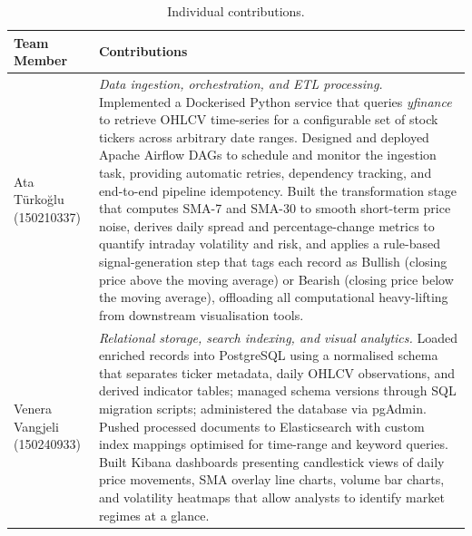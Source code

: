 \documentclass[conference]{IEEEtran}
\begin{document}
\begin{table}[ht]
  \centering
  \caption{Individual contributions.}
  \begin{tabular}{p{3cm}p{4.5cm}}
    \toprule
    \textbf{Team Member} & \textbf{Contributions} \\
    \midrule
    Ata Türkoğlu (150210337) &
      \textit{Data ingestion, orchestration, and ETL processing.}
      Implemented a Dockerised Python service that queries \textit{yfinance}
      to retrieve OHLCV time-series for a configurable set of stock tickers
      across arbitrary date ranges.
      Designed and deployed Apache Airflow DAGs to schedule and monitor the
      ingestion task, providing automatic retries, dependency tracking, and
      end-to-end pipeline idempotency.
      Built the transformation stage that computes SMA-7 and SMA-30 to smooth
      short-term price noise, derives daily spread and percentage-change metrics
      to quantify intraday volatility and risk, and applies a rule-based
      signal-generation step that tags each record as Bullish (closing price
      above the moving average) or Bearish (closing price below the moving
      average), offloading all computational heavy-lifting from downstream
      visualisation tools. \\
    \midrule
    Venera Vangjeli (150240933) &
      \textit{Relational storage, search indexing, and visual analytics.}
      Loaded enriched records into PostgreSQL using a normalised schema that
      separates ticker metadata, daily OHLCV observations, and derived indicator
      tables; managed schema versions through SQL migration scripts; administered
      the database via pgAdmin.
      Pushed processed documents to Elasticsearch with custom index mappings
      optimised for time-range and keyword queries.
      Built Kibana dashboards presenting candlestick views of daily price
      movements, SMA overlay line charts, volume bar charts, and volatility
      heatmaps that allow analysts to identify market regimes at a glance. \\
    \bottomrule
  \end{tabular}
\end{table}
\end{document}
